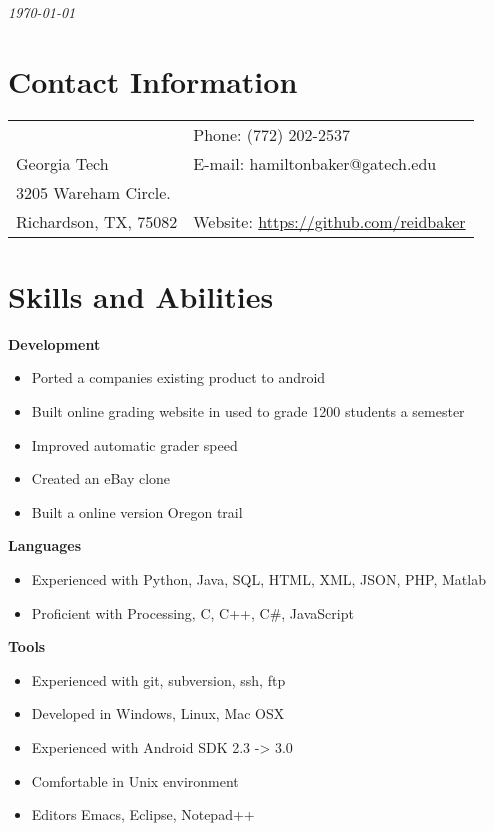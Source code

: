 \documentclass[margin,line]{res}
\begin{document}
 \hfill {\em \today}

\begin{resume}
\section{\sc Contact Information}

\vspace{.05in}
\begin{tabular}{@{}p{3.5in}p{3in}} & {Phone:}  (772) 202-2537 \\
Georgia Tech & {E-mail:}  hamiltonbaker@gatech.edu\\
3205 Wareham Circle. \\
Richardson, TX, 75082  & {Website:} \url{https://github.com/reidbaker}
\end{tabular}
 
\section{\sc Skills and Abilities}
 {\bf Development}
    \begin{itemize}
    \item Ported a companies existing product to android
    \item Built online grading website in used to grade 1200 students a
      semester
    \item Improved automatic grader speed
    \item Created an eBay clone
    \item Built a online version Oregon trail
    \end{itemize}

 {\bf Languages}
    \begin{itemize}
    \item Experienced with Python, Java, SQL, HTML, XML, JSON,
      PHP, Matlab
    \item Proficient with Processing, C, C++, C\#, JavaScript
    \end{itemize}

 {\bf Tools}
    \begin{itemize}
    \item Experienced with git, subversion, ssh, ftp
    \item Developed in Windows, Linux, Mac OSX
    \item Experienced with Android SDK 2.3 -> 3.0
    \item Comfortable in Unix environment
    \item Editors Emacs, Eclipse, Notepad++
    \end{itemize}


\end{resume}
\end{document}
